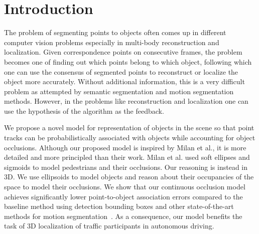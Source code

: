 \section{Introduction}
The problem of segmenting points to objects often comes up in different
computer vision problems especially in multi-body 
reconstruction and localization. Given correspondence points on
consecutive frames, the problem becomes one of finding out which points belong
to which object, following which one can use the consensus of segmented points
to reconstruct or localize the object more accurately. Without additional 
information, this is a very difficult problem as attempted by semantic segmentation 
and motion segmentation methods. However, in the problems like reconstruction and
localization one can use the hypothesis of the algorithm as the feedback.

We propose a novel model for representation of objects in the scene so that point tracks
can be probabilistically associated with objects while accounting for object occlusions.
Although our proposed model is inspired by Milan et
al.\cite{Milan_etal_2014}, it is more detailed and more principled than their
work. Milan et al. used soft ellipses and sigmoids to model pedestrians and
their occlusions. Our reasoning is instead in 3D. We use ellipsoids to model objects
and reason about their occupancies of the space to model their occlusions.
We show that our continuous occlusion model achieves significantly lower point-to-object association errors compared to the baseline method using detection bounding boxes and other state-of-the-art methods for motion segmentation~\cite{Brox_Malik_2010, Rao_etal_2010}. As a consequence, our model benefits the task of 3D localization of traffic participants in autonomous driving.
